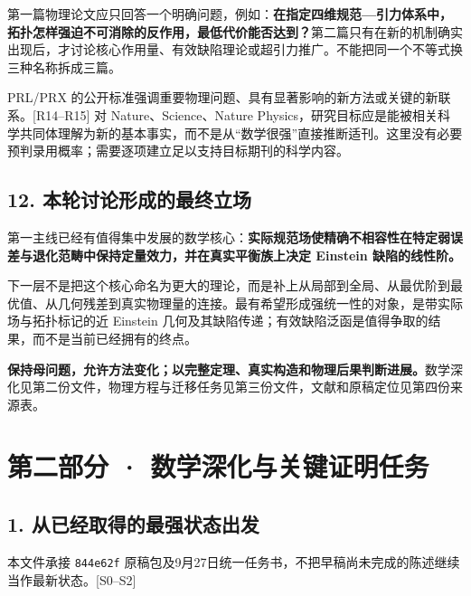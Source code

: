 \documentclass[UTF8,a4paper,11pt,fontset=fandol]{ctexart}
\begin{document}
第一篇物理论文应只回答一个明确问题，例如：\textbf{在指定四维规范---引力体系中，拓扑怎样强迫不可消除的反作用，最低代价能否达到？}第二篇只有在新的机制确实出现后，才讨论核心作用量、有效缺陷理论或超引力推广。不能把同一个不等式换三种名称拆成三篇。

PRL/PRX
的公开标准强调重要物理问题、具有显著影响的新方法或关键的新联系。{[}R14--R15{]}
对 Nature、Science、Nature
Physics，研究目标应是能被相关科学共同体理解为新的基本事实，而不是从``数学很强''直接推断适刊。这里没有必要预判录用概率；需要逐项建立足以支持目标期刊的科学内容。

\subsection{12.
本轮讨论形成的最终立场}\label{ux672cux8f6eux8ba8ux8bbaux5f62ux6210ux7684ux6700ux7ec8ux7acbux573a}

第一主线已经有值得集中发展的数学核心：\textbf{实际规范场使精确不相容性在特定弱误差与退化范畴中保持定量效力，并在真实平衡族上决定
Einstein 缺陷的线性阶。}

下一层不是把这个核心命名为更大的理论，而是补上从局部到全局、从最优阶到最优值、从几何残差到真实物理量的连接。最有希望形成强统一性的对象，是带实际场与拓扑标记的近
Einstein
几何及其缺陷传递；有效缺陷泛函是值得争取的结果，而不是当前已经拥有的终点。

\textbf{保持母问题，允许方法变化；以完整定理、真实构造和物理后果判断进展。}数学深化见第二份文件，物理方程与迁移任务见第三份文件，文献和原稿定位见第四份来源表。

\clearpage
\section{第二部分 ·
数学深化与关键证明任务}\label{ux7b2cux4e8cux90e8ux5206-ux6570ux5b66ux6df1ux5316ux4e0eux5173ux952eux8bc1ux660eux4efbux52a1}

\subsection{1.
从已经取得的最强状态出发}\label{ux4eceux5df2ux7ecfux53d6ux5f97ux7684ux6700ux5f3aux72b6ux6001ux51faux53d1}

本文件承接 \texttt{844e62f}
原稿包及9月27日统一任务书，不把早稿尚未完成的陈述继续当作最新状态。{[}S0--S2{]}
\end{document}
